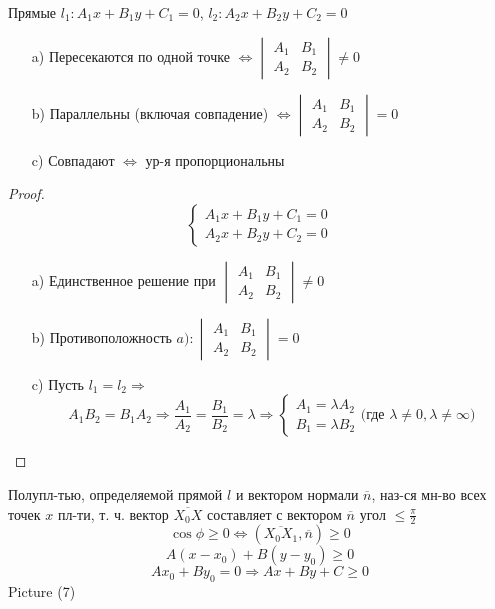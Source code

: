 \begin{statement}
Прямые $l_1\colon A_1x + B_1y + C_1 = 0$, $l_2\colon A_2x + B_2y + C_2 = 0$
\begin{itemize}
  \item [a) ] Пересекаются по одной точке $\iff \begin{vmatrix}A_1 & B_1 \\ A_2 & B_2 \end{vmatrix} \neq 0$ 
  \item [b) ] Параллельны (включая совпадение) $\iff \begin{vmatrix} A_1 & B_1 \\ A_2 & B_2 \end{vmatrix} = 0$
  \item [c) ] Совпадают $\iff$ ур-я пропорциональны
\end{itemize}
\end{statement}
\begin{proof}
\begin{equation*}
\begin{cases}
A_1x + B_1y + C_1 = 0 \\
A_2x + B_2y + C_2 = 0
\end{cases}
\end{equation*}
\begin{itemize}
  \item [a) ] Единственное решение при $\begin{vmatrix}A_1 & B_1 \\ A_2 & B_2 \end{vmatrix} \neq 0$
  \item [b) ] Противоположность $a) \colon \begin{vmatrix} A_1 & B_1 \\ A_2 & B_2 \end{vmatrix} = 0$
  \item [c) ] Пусть $l_1 = l_2 \Rightarrow$
    \begin{equation*}
    A_1B_2 = B_1A_2 \Rightarrow \frac{A_1}{A_2} = \frac{B_1}{B_2} = \lambda \Rightarrow
    \begin{cases}
   A_1 = \lambda A_2 \\
   B_1 = \lambda B_2
    \end{cases} \text{(где $\lambda \neq 0, \lambda \neq \infty$)}
    \end{equation*}
\end{itemize}
\end{proof}
\begin{definition}
Полупл-тью, определяемой прямой $l$ и вектором нормали $\overline{n}$, наз-ся мн-во всех точек $x$ пл-ти, т. ч. вектор $\overline{X_0X}$ составляет с вектором $\overline{n}$ угол $\leq \frac{\pi}{2}$
\[
\cos\phi \geq 0 \iff (\overline{X_0X_1}, \overline{n}) \geq 0
\]
\[
A(x - x_0) + B(y - y_0) \geq 0
\]
\[
Ax_0 + By_0 = 0 \Rightarrow Ax + By + C \geq 0
\]
Picture (7)
\end{definition}
